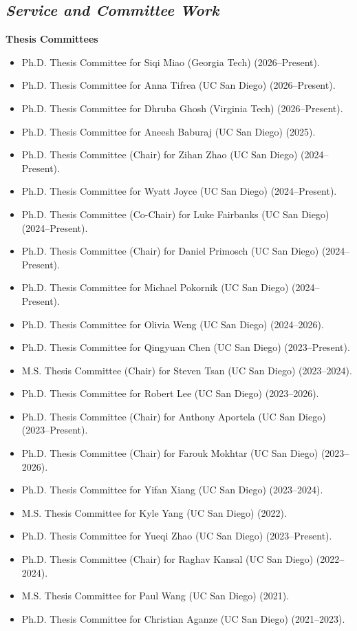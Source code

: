 \documentclass[11pt]{res}
\newcommand{\MarginText}[1]{\section{\textit{#1}}}
\begin{document}
\begin{resume}

  \MarginText{Service and Committee Work}

  \textbf{Thesis Committees}
  \begin{itemize}
    \item Ph.D. Thesis Committee for Siqi Miao (Georgia Tech) (2026--Present).
    \item Ph.D. Thesis Committee for Anna Tifrea (UC San Diego) (2026--Present).
    \item Ph.D. Thesis Committee for Dhruba Ghosh (Virginia Tech) (2026--Present).
    \item Ph.D. Thesis Committee for Aneesh Baburaj (UC San Diego) (2025).
    \item Ph.D. Thesis Committee (Chair) for Zihan Zhao (UC San Diego) (2024--Present).
    \item Ph.D. Thesis Committee for Wyatt Joyce (UC San Diego) (2024--Present).
    \item Ph.D. Thesis Committee (Co-Chair) for Luke Fairbanks (UC San Diego) (2024--Present).
    \item Ph.D. Thesis Committee (Chair) for Daniel Primosch (UC San Diego) (2024--Present).
    \item Ph.D. Thesis Committee for Michael Pokornik (UC San Diego) (2024--Present).
    \item Ph.D. Thesis Committee for Olivia Weng (UC San Diego) (2024--2026).
    \item Ph.D. Thesis Committee for Qingyuan Chen (UC San Diego) (2023--Present).
    \item M.S. Thesis Committee (Chair) for Steven Tsan (UC San Diego) (2023--2024).
    \item Ph.D. Thesis Committee for Robert Lee (UC San Diego) (2023--2026).
    \item Ph.D. Thesis Committee (Chair) for Anthony Aportela (UC San Diego) (2023--Present).
    \item Ph.D. Thesis Committee (Chair) for Farouk Mokhtar (UC San Diego) (2023--2026).
    \item Ph.D. Thesis Committee for Yifan Xiang (UC San Diego) (2023--2024).
    \item M.S. Thesis Committee for Kyle Yang (UC San Diego) ({2022}).
    \item Ph.D. Thesis Committee for Yueqi Zhao (UC San Diego) (2023--Present).
    \item Ph.D. Thesis Committee (Chair) for Raghav Kansal (UC San Diego) ({2022--2024}).
    \item M.S. Thesis Committee for Paul Wang (UC San Diego) ({2021}).
    \item Ph.D. Thesis Committee for Christian Aganze (UC San Diego) ({2021--2023}).
  \end{itemize}


\end{resume}
\end{document}
